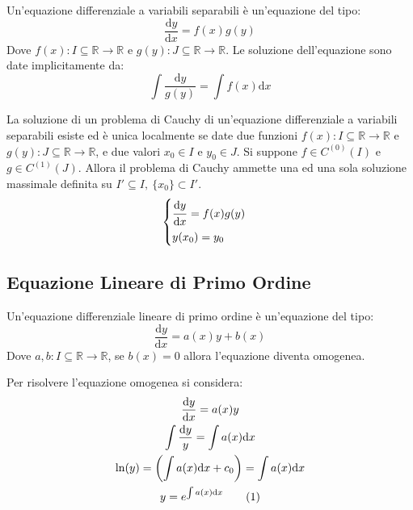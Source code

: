 \documentclass{article}
\numberwithin{equation}{subsection}
\newcommand{\df}{\mathrm{d}}
\newcommand{\tageq}{\tag{\stepcounter{equation}\theequation}}
\newcommand{\Frac}[2]{\displaystyle\frac{\strut{#1}}{\strut{#2}}}
\begin{document}

Un'equazione differenziale a variabili separabili è un'equazione del tipo:
\begin{equation}
    \displaystyle\frac{\df y}{\df x}=f(x)g(y)
\end{equation}
Dove $f(x):I\subseteq\mathbb{R}\to\mathbb{R}$ e $g(y):J\subseteq\mathbb{R}\to\mathbb{R}$. 
Le soluzione dell'equazione sono date implicitamente da:
\begin{equation}
    \displaystyle\int\frac{\df y}{g(y)}=\int f(x)\df x
\end{equation}


La soluzione di un problema di Cauchy di un'equazione differenziale a variabili separabili esiste ed è unica localmente se date due funzioni 
$f(x):I\subseteq\mathbb{R}\to\mathbb{R}$ e $g(y):J\subseteq\mathbb{R}\to\mathbb{R}$, e due valori $x_0\in I$ e $y_0\in J$. Si suppone $f\in C^{(0)}(I)$ e $g\in C^{(1)}(J)$. 
Allora il problema di Cauchy ammette una ed una sola soluzione massimale definita su $I'\subseteq I,\:\{x_0\}\subset I'$. 
\begin{equation*}
    \begin{cases}
        \displaystyle\Frac{\df y}{\df x}=f(x)g(y)\\
        y(x_0)=y_0
    \end{cases}
\end{equation*}

\subsection{Equazione Lineare di Primo Ordine}

Un'equazione differenziale lineare di primo ordine è un'equazione del tipo:
\begin{equation}
    \displaystyle\frac{\df y}{\df x}=a(x)y+b(x)
\end{equation}
Dove $a,b:I\subseteq\mathbb{R}\to\mathbb{R}$, se $b(x)=0$ allora l'equazione diventa omogenea.

Per risolvere l'equazione omogenea si considera:
\begin{gather*}
    \displaystyle\frac{\df y}{\df x}=a(x)y\\
    \displaystyle\int\frac{\df y}{y}=\int a(x)\df x\\
    \displaystyle \ln(y)=\left(\int a(x)\df x+c_0\right)=\int a(x)\df x\\
    y=\displaystyle e^{\int a(x)\df x}\tageq
\end{gather*}
\end{document}
